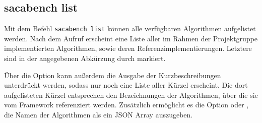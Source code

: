 \subsection{sacabench list}
\label{framework:cli:sacabench-list}

Mit dem Befehl \texttt{sacabench list} können alle verfügbaren Algorithmen aufgelistet werden.
Nach dem Aufruf erscheint eine Liste aller im Rahmen der Projektgruppe implementierten Algorithmen, sowie deren Referenzimplementierungen. 
Letztere sind in der angegebenen Abkürzung durch  markiert.\par
Über die Option  kann außerdem die Ausgabe der Kurz\-be\-schrei\-bungen unterdrückt werden, sodass nur noch eine Liste aller Kürzel erscheint. 
Die dort aufgelisteten Kürzel entsprechen den Bezeichnungen der Algorithmen, über die sie vom Framework referenziert werden.
Zusätzlich ermöglicht es die Option  oder , die Namen der Algorithmen als ein JSON Array auszugeben.\par
